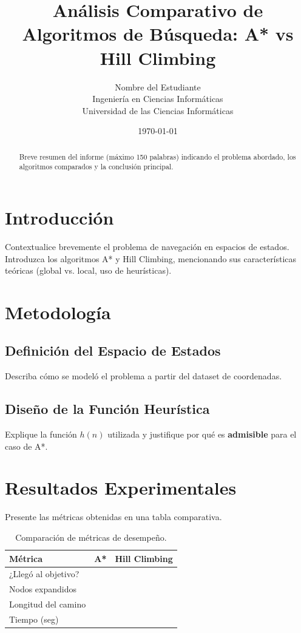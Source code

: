 \documentclass[12px,a4paper]{article}
\title{\textbf{Análisis Comparativo de Algoritmos de Búsqueda: A* vs Hill Climbing}}
\author{Nombre del Estudiante \\ Ingeniería en Ciencias Informáticas \\ Universidad de las Ciencias Informáticas}
\date{\today}
\begin{document}
\maketitle

\begin{abstract}
Breve resumen del informe (máximo 150 palabras) indicando el problema abordado, los algoritmos comparados y la conclusión principal.
\end{abstract}

\section{Introducción}
Contextualice brevemente el problema de navegación en espacios de estados. Introduzca los algoritmos A* y Hill Climbing, mencionando sus características teóricas (global vs. local, uso de heurísticas).

\section{Metodología}
\subsection{Definición del Espacio de Estados}
Describa cómo se modeló el problema a partir del dataset de coordenadas.
\subsection{Diseño de la Función Heurística}
Explique la función $h(n)$ utilizada y justifique por qué es \textbf{admisible} para el caso de A*.

\section{Resultados Experimentales}
Presente las métricas obtenidas en una tabla comparativa. 
\begin{table}[h!]
\centering
\begin{tabular}{|l|c|c|}
\hline
\textbf{Métrica} & \textbf{A*} & \textbf{Hill Climbing} \\ \hline
¿Llegó al objetivo? &  &  \\ \hline
Nodos expandidos &  &  \\ \hline
Longitud del camino &  &  \\ \hline
Tiempo (seg) &  &  \\ \hline
\end{tabular}
\caption{Comparación de métricas de desempeño.}
\end{table}
\end{document}
